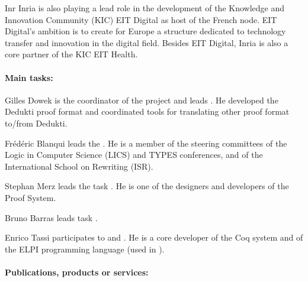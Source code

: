 \begin{sitedescription}{Inr}
Inria is also playing a lead role in the development of the Knowledge and Innovation Community (KIC) EIT Digital as host of the French node. EIT Digital’s ambition is to create for Europe a structure dedicated to technology transfer and innovation in the digital field. Besides EIT Digital, Inria is also a core partner of the KIC EIT Health.

\paragraph*{Main tasks:}


\begin{compactitem}
\item Gilles Dowek is the coordinator of the project and leads
  . He developed the Dedukti proof format and
  coordinated tools for translating other proof format to/from
  Dedukti.
\item Frédéric Blanqui leads the . He is a member of the
  steering committees of the Logic in Computer Science (LICS) and
  TYPES conferences, and of the International School on Rewriting
  (ISR).
\item Stephan Merz leads the task .
  He is one of the designers and developers of the \tlaplus Proof System.
\item Bruno Barras leads task .
\item Enrico Tassi participates to  and . He is a core
developer of the Coq system and of the ELPI programming language (used in ).
\end{compactitem}

\paragraph*{Publications, products or services:}



\end{sitedescription}
